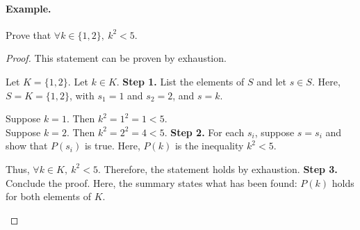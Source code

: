\paragraph{Example.}
\begin{exercise}{
    Prove that $\forall k \in \{1, 2\},\ k^2 < 5$.
}
\end{exercise}
\begin{proof}{
    This statement can be proven by exhaustion.

    \begin{annotatedpanel}[Setup.]{
        Let $K = \{1, 2\}$. %
        Let $k \in K$.
    }{
        \textbf{Step 1.} List the elements of $S$ and let $s \in S$. %
        Here, $S = K = \{1, 2\}$, with $s_1 = 1$ and $s_2 = 2$, %
        and $s = k$.
    }
    \end{annotatedpanel}

    \begin{annotatedpanel}[Verification.]{
        Suppose $k = 1$. %
        Then $k^2 = 1^2 = 1 < 5$. \\
        Suppose $k = 2$. %
        Then $k^2 = 2^2 = 4 < 5$.
    }{
        \textbf{Step 2.} For each $s_i$, suppose $s = s_i$ and show that %
        $P(s_i)$ is true. %
        Here, $P(k)$ is the inequality $k^2 < 5$.
    }
    \end{annotatedpanel}

    \begin{annotatedpanel}[Conclusion.]{
        Thus, $\forall k \in K,\ k^2 < 5$. %
        Therefore, the statement holds by exhaustion. \qedhere
    }{
        \textbf{Step 3.} Conclude the proof. %
        Here, the summary states what has been found: %
        $P(k)$ holds for both elements of $K$.
    }
    \end{annotatedpanel}
}
\end{proof}